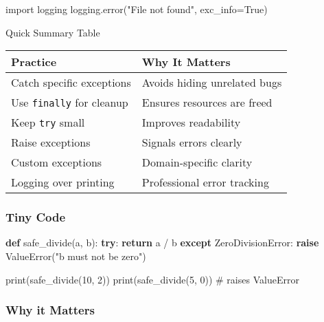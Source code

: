 \documentclass[
  letterpaper,
  DIV=11,
  numbers=noendperiod]{scrreprt}
\newenvironment{Shaded}{\begin{snugshade}}{\end{snugshade}}
\newcommand{\BuiltInTok}[1]{\textcolor[rgb]{0.00,0.23,0.31}{#1}}
\newcommand{\CommentTok}[1]{\textcolor[rgb]{0.37,0.37,0.37}{#1}}
\newcommand{\ControlFlowTok}[1]{\textcolor[rgb]{0.00,0.23,0.31}{\textbf{#1}}}
\newcommand{\DecValTok}[1]{\textcolor[rgb]{0.68,0.00,0.00}{#1}}
\newcommand{\ImportTok}[1]{\textcolor[rgb]{0.00,0.46,0.62}{#1}}
\newcommand{\KeywordTok}[1]{\textcolor[rgb]{0.00,0.23,0.31}{\textbf{#1}}}
\newcommand{\NormalTok}[1]{\textcolor[rgb]{0.00,0.23,0.31}{#1}}
\newcommand{\OperatorTok}[1]{\textcolor[rgb]{0.37,0.37,0.37}{#1}}
\newcommand{\PreprocessorTok}[1]{\textcolor[rgb]{0.68,0.00,0.00}{#1}}
\newcommand{\StringTok}[1]{\textcolor[rgb]{0.13,0.47,0.30}{#1}}
\newcommand{\VariableTok}[1]{\textcolor[rgb]{0.07,0.07,0.07}{#1}}
\begin{document}
\begin{Shaded}
\begin{Highlighting}[]
\ImportTok{import}\NormalTok{ logging}
\NormalTok{logging.error(}\StringTok{"File not found"}\NormalTok{, exc\_info}\OperatorTok{=}\VariableTok{True}\NormalTok{)}
\end{Highlighting}
\end{Shaded}

Quick Summary Table

\begin{longtable}[]{@{}ll@{}}
\toprule\noalign{}
Practice & Why It Matters \\
\midrule\noalign{}
\endhead
\bottomrule\noalign{}
\endlastfoot
Catch specific exceptions & Avoids hiding unrelated bugs \\
Use \texttt{finally} for cleanup & Ensures resources are freed \\
Keep \texttt{try} small & Improves readability \\
Raise exceptions & Signals errors clearly \\
Custom exceptions & Domain-specific clarity \\
Logging over printing & Professional error tracking \\
\end{longtable}

\subsubsection{Tiny Code}\label{tiny-code-79}

\begin{Shaded}
\begin{Highlighting}[]
\KeywordTok{def}\NormalTok{ safe\_divide(a, b):}
    \ControlFlowTok{try}\NormalTok{:}
        \ControlFlowTok{return}\NormalTok{ a }\OperatorTok{/}\NormalTok{ b}
    \ControlFlowTok{except} \PreprocessorTok{ZeroDivisionError}\NormalTok{:}
        \ControlFlowTok{raise} \PreprocessorTok{ValueError}\NormalTok{(}\StringTok{"b must not be zero"}\NormalTok{)}

\BuiltInTok{print}\NormalTok{(safe\_divide(}\DecValTok{10}\NormalTok{, }\DecValTok{2}\NormalTok{))}
\BuiltInTok{print}\NormalTok{(safe\_divide(}\DecValTok{5}\NormalTok{, }\DecValTok{0}\NormalTok{))   }\CommentTok{\# raises ValueError}
\end{Highlighting}
\end{Shaded}

\subsubsection{Why it Matters}\label{why-it-matters-79}
\end{document}
